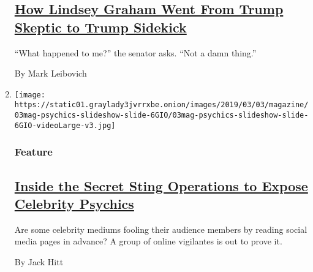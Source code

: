 \begin{enumerate}
  \hypertarget{how-lindsey-graham-went-from-trump-skeptic-to-trump-sidekick}{%
  \subsection{\texorpdfstring{\href{/2019/02/25/magazine/lindsey-graham-what-happened-trump.html}{How
  Lindsey Graham Went From Trump Skeptic to Trump
  Sidekick}}{How Lindsey Graham Went From Trump Skeptic to Trump Sidekick}}\label{how-lindsey-graham-went-from-trump-skeptic-to-trump-sidekick}}

  ``What happened to me?'' the senator asks. ``Not a damn thing.''

  By Mark Leibovich
\item
  \texttt{[image: https://static01.graylady3jvrrxbe.onion/images/2019/03/03/magazine/03mag-psychics-slideshow-slide-6GIO/03mag-psychics-slideshow-slide-6GIO-videoLarge-v3.jpg]}

  \hypertarget{feature-1}{%
  \subsubsection{Feature}\label{feature-1}}

  \hypertarget{inside-the-secret-sting-operations-to-expose-celebrity-psychics}{%
  \subsection{\texorpdfstring{\href{/2019/02/26/magazine/psychics-skeptics-facebook.html}{Inside
  the Secret Sting Operations to Expose Celebrity
  Psychics}}{Inside the Secret Sting Operations to Expose Celebrity Psychics}}\label{inside-the-secret-sting-operations-to-expose-celebrity-psychics}}

  Are some celebrity mediums fooling their audience members by reading
  social media pages in advance? A group of online vigilantes is out to
  prove it.

  By Jack Hitt
\end{enumerate}

